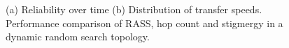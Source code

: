 \begin{figure}[htbp]
    \centering
    \caption{(a) Reliability over time (b) Distribution of transfer speeds. Performance comparison of RASS, hop count and stigmergy in a dynamic random search topology.}
    \label{results:dynamicTopologyRandom}
    \vspace{-2mm}
\end{figure}


